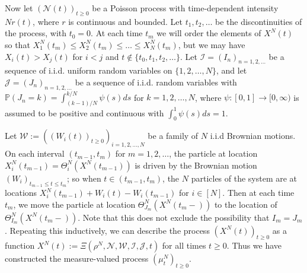 \documentclass{article}
\newcommand{\B}[1]{\mathbb{#1}}
\newcommand{\C}[1]{\mathcal{#1}}
\newcommand{\JB}[1]{\textcolor{blue!70!black}{\textbf{JB:} #1}}
\begin{document}
Now let $(\C{N}(t))_{t\geq 0}$ be a Poisson process with time-dependent intensity $Nr(t)$, where $r$ is continuous and bounded. Let $t_1,t_2,\ldots$ be the discontinuities of the process, with $t_0=0$. At each time $t_m$ we will order the elements of $X^N(t)$ so that $X_1^N(t_m)\leq X_2^N(t_m)\leq  \ldots \leq X_N^N(t_m)$, but we may have $X_i(t)>X_j(t)$ for $i<j$ and $t\notin\{t_0,t_1,t_2,\ldots\}$. Let $\C{I}=(I_n)_{n=1,2,\ldots}$ be a sequence of i.i.d. uniform random variables on $\{1,2,\ldots,N\}$, and let $\C{J}=(J_n)_{n=1,2,\ldots}$ be a sequence of i.i.d. random variables with $\B{P}(J_n=k)=\int_{(k-1)/N}^{k/N}\psi(s)ds$ for $k=1,2,\ldots,N$, where $\psi:[0,1]\to[0,\infty)$ is assumed to be positive and continuous with $\int_0^1 \psi(s)ds=1$.



Let $\C{W}:=((W_i(t))_{t\geq 0})_{i=1,2,\ldots,N}$ be a family of $N$ i.i.d Brownian motions. On each interval $(t_{m-1},t_m)$ for $m=1,2,\ldots$, the particle at location $X_i^N(t_{m-1})=\Theta^N_i(X^N(t_{m-1}))$ is driven by the Brownian motion $(W_i)_{t_{m-1}\leq t\leq t_m}$; so when $t\in (t_{m-1},t_m)$, the $N$ particles of the system are at locations $X^N_i(t_{m-1})+ W_i(t) - W_i(t_{m-1})$ for $i\in [N]$. Then at each time $t_{m}$, we move the particle at location $\Theta^N_{J_m}(X^N(t_m-))$ to the location of $\Theta^N_{I_m}(X^N(t_m-))$. Note that this does not exclude the possibility that $I_m=J_m$. Repeating this inductively, we can describe the process $(X^N(t))_{t\geq 0}$ as a function $X^N(t):=\Xi(\rho^N, \C{N},\C{W},\C{I},\C{J},t)$ for all times $t\geq 0$. Thus we have constructed the measure-valued process $(\mu^N_t)_{t\geq 0}$. %
\end{document}
